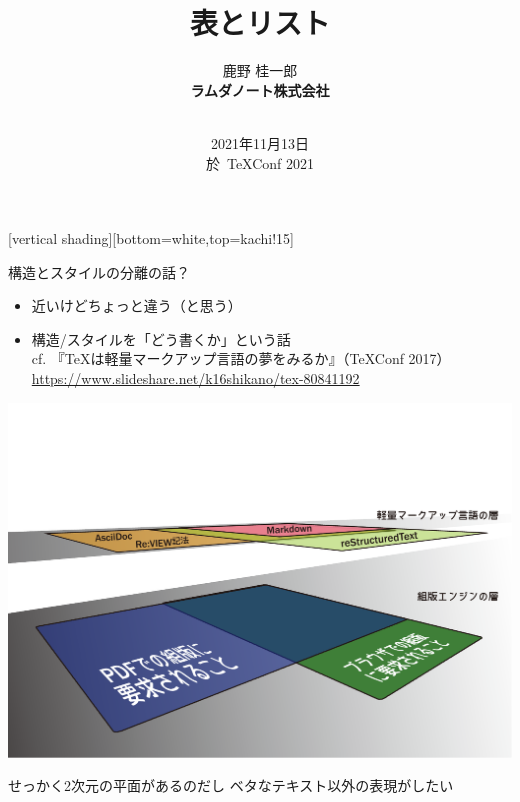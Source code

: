 \documentclass[14pt,dvipdfmx,uplatex]{beamer}
\title{表とリスト}
\author{\sffamily 鹿野 桂一郎\\
\bfseries ラムダノート株式会社\\
\small\bfseries \email{k16.shikano@lambdanote.com} \\ 
\twitter{golden\_lucky} 
}
\date{\sffamily\footnotesize 2021年11月13日\\ 於\, TeXConf 2021}
\begin{document}
\selectfont

\frame{\titlepage}

[vertical shading][bottom=white,top=kachi!15]

\begin{frame}[t]{\inhibitglue 構造とスタイルの分離の話？}
  \sffamily
    \begin{itemize}
      \item 近いけどちょっと違う（と思う）
      \item 構造/スタイルを「どう書くか」という話\\
        \footnotesize cf. 『\TeX{}は軽量マークアップ言語の夢をみるか』（\TeX{}Conf 2017）\\
        \url{https://www.slideshare.net/k16shikano/tex-80841192}
    \end{itemize}
    \vspace*{-5\baselineskip}
    \begin{center}
      \includegraphics[height=0.9\paperheight]{figures/lightweightmarkup6.pdf}
    \end{center}
    \vfill
\end{frame}

\begin{frame}[plain]
  \begin{center}
    \color{kachi}\yasagoth
    せっかく2次元の平面があるのだし
    ベタなテキスト以外の表現がしたい
  \end{center}
\end{frame}
\end{document}
